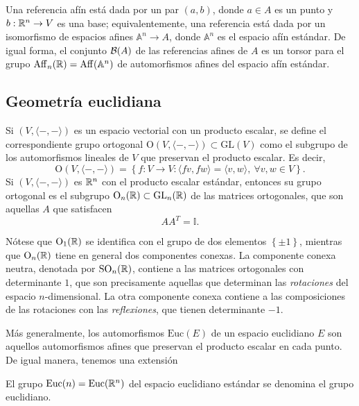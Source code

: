 \documentclass[11pt,a4paper]{amsbook}
\theoremstyle{remark} \newtheorem{rmk}[subsection]{Observación}
\theoremstyle{definition} \newtheorem{defn}[subsection]{Definición}
\theoremstyle{definition} \newtheorem{ex}[subsection]{Ejemplo}
\theoremstyle{definition} \newtheorem{ej}[subsection]{Ejercicio}
\begin{document}
Una referencia afín está dada por un par $(a,b)$, donde $a\in A$ es un punto y $b:\mathbb R^n\rightarrow V$ es una base; equivalentemente, una referencia está dada por un isomorfismo de espacios afines $\mathbb{A}^n \rightarrow A$, donde $\mathbb{A}^n$ es el espacio afín estándar. De igual forma, el conjunto $\mathcal B(A)$ de las referencias afines de $A$ es un torsor para el grupo $\mathrm{Aff}_n(\mathbb R)=\mathrm{Aff}(\mathbb{A}^n)$ de automorfismos afines del espacio afín estándar.

\subsection{Geometría euclidiana} Si $(V,\langle-,-\rangle)$ es un espacio vectorial con un producto escalar, se define el correspondiente grupo ortogonal $\mathrm{O}(V,\langle-,-\rangle)\subset \mathrm{GL}(V)$ como el subgrupo de los automorfismos lineales de $V$ que preservan el producto escalar. Es decir,
\begin{equation*}
\mathrm{O}(V,\langle-,-\rangle) = \left\{ f:V\rightarrow V: \langle fv,fw\rangle = \langle v,w \rangle, \  \forall v,w \in V \right\}.
\end{equation*}
Si $(V,\langle-,-\rangle)$ es $\mathbb R^n$ con el producto escalar estándar, entonces su grupo ortogonal es el subgrupo $\mathrm{O}_n(\mathbb R)\subset \mathrm{GL}_n(\mathbb R)$ de las matrices ortogonales, que son aquellas $A$ que satisfacen
\begin{equation*}
A A^T = \mathbb{I}.
\end{equation*}

Nótese que $\mathrm{O}_1(\mathbb R)$ se identifica con el grupo de dos elementos $\left\{ \pm 1 \right\}$, mientras que $\mathrm{O}_n(\mathbb R)$ tiene en general dos componentes conexas. La componente conexa neutra, denotada por $\mathrm{SO}_n(\mathbb R)$, contiene a las matrices ortogonales con determinante $1$, que son precisamente aquellas que determinan las \emph{rotaciones} del espacio $n$-dimensional. La otra componente conexa contiene a las composiciones de las rotaciones con las \emph{reflexiones}, que tienen determinante $-1$.

Más generalmente, los automorfismos $\mathrm{Euc}(E)$ de un espacio euclidiano $E$ son aquellos automorfismos afines que preservan el producto escalar en cada punto. De igual manera, tenemos una extensión
\begin{center}
\end{center}
El grupo $\mathrm{Euc}(n)=\mathrm{Euc}(\mathbb R^n)$ del espacio euclidiano estándar se denomina el grupo euclidiano.
\end{document}
